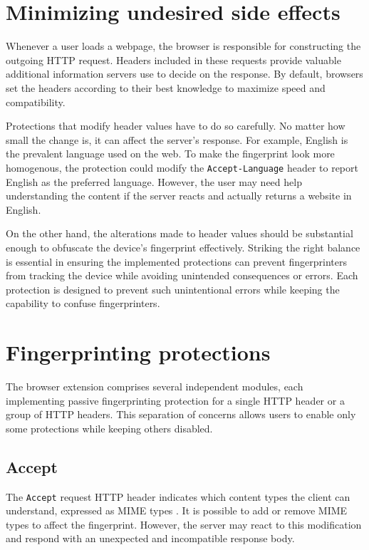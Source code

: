 \section{Minimizing undesired side effects}

Whenever a user loads a webpage, the browser is responsible for constructing the outgoing HTTP request. Headers included in these requests provide valuable additional information servers use to decide on the response. By default, browsers set the headers according to their best knowledge to maximize speed and compatibility.

Protections that modify header values have to do so carefully. No matter how small the change is, it can affect the server's response. For example, English is the prevalent language used on the web. To make the fingerprint look more homogenous, the protection could modify the \texttt{Accept-Language} header to report English as the preferred language. However, the user may need help understanding the content if the server reacts and actually returns a website in English.

On the other hand, the alterations made to header values should be substantial enough to obfuscate the device's fingerprint effectively. Striking the right balance is essential in ensuring the implemented protections can prevent fingerprinters from tracking the device while avoiding unintended consequences or errors. Each protection is designed to prevent such unintentional errors while keeping the capability to confuse fingerprinters.

\section{Fingerprinting protections}

The browser extension comprises several independent modules, each implementing passive fingerprinting protection for a single HTTP header or a group of HTTP headers. This separation of concerns allows users to enable only some protections while keeping others disabled.

\subsection{Accept}
\label{Section:HTTPHeaderAccept}

The \texttt{Accept} request HTTP header indicates which content types the client can understand, expressed as MIME types \cite{MDN}. It is possible to add or remove MIME types to affect the fingerprint. However, the server may react to this modification and respond with an unexpected and incompatible response body.

